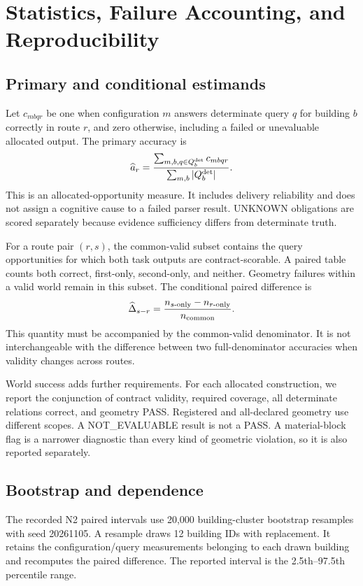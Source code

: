 \section{Statistics, Failure Accounting, and Reproducibility}\label{app:J}
\subsection{Primary and conditional estimands}
Let $c_{mbqr}$ be one when configuration $m$ answers determinate query $q$ for building $b$ correctly in route $r$, and zero otherwise, including a failed or unevaluable allocated output. The primary accuracy is
\begin{equation}
\widehat a_r=\frac{\sum_{m,b,q\in Q_b^{\rm det}}c_{mbqr}}
{\sum_{m,b}|Q_b^{\rm det}|}.
\end{equation}
This is an allocated-opportunity measure. It includes delivery reliability and does not assign a cognitive cause to a failed parser result. UNKNOWN obligations are scored separately because evidence sufficiency differs from determinate truth.

For a route pair $(r,s)$, the common-valid subset contains the query opportunities for which both task outputs are contract-scorable. A paired table counts both correct, first-only, second-only, and neither. Geometry failures within a valid world remain in this subset. The conditional paired difference is
\begin{equation}
\widehat\Delta_{s-r}=\frac{n_{s\text{-only}}-n_{r\text{-only}}}{n_{\rm common}}.
\end{equation}
This quantity must be accompanied by the common-valid denominator. It is not interchangeable with the difference between two full-denominator accuracies when validity changes across routes.

World success adds further requirements. For each allocated construction, we report the conjunction of contract validity, required coverage, all determinate relations correct, and geometry PASS. Registered and all-declared geometry use different scopes. A NOT\_EVALUABLE result is not a PASS. A material-block flag is a narrower diagnostic than every kind of geometric violation, so it is also reported separately.

\subsection{Bootstrap and dependence}
The recorded N2 paired intervals use 20,000 building-cluster bootstrap resamples with seed 20261105. A resample draws 12 building IDs with replacement. It retains the configuration/query measurements belonging to each drawn building and recomputes the paired difference. The reported interval is the 2.5th--97.5th percentile range.

